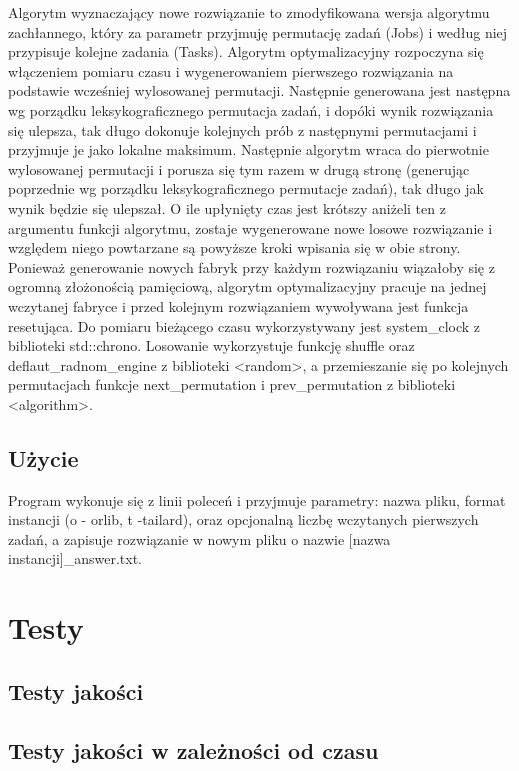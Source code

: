 \documentclass[]{article}
\begin{document}
	Algorytm wyznaczający nowe rozwiązanie to zmodyfikowana wersja algorytmu zachłannego, który za parametr przyjmuję permutację zadań (Jobs) i według niej przypisuje kolejne zadania (Tasks). 
	Algorytm optymalizacyjny rozpoczyna się włączeniem pomiaru czasu i wygenerowaniem pierwszego rozwiązania na podstawie wcześniej wylosowanej permutacji. Następnie generowana jest następna wg porządku leksykograficznego permutacja zadań, i dopóki wynik rozwiązania się ulepsza, tak długo dokonuje kolejnych prób z następnymi permutacjami i przyjmuje je jako lokalne maksimum. Następnie algorytm wraca do pierwotnie wylosowanej permutacji i porusza się tym razem w drugą stronę (generując poprzednie wg porządku leksykograficznego permutacje zadań), tak długo jak wynik będzie się ulepszał. O ile upłynięty czas jest krótszy aniżeli ten z argumentu funkcji algorytmu, zostaje wygenerowane nowe losowe rozwiązanie i względem niego powtarzane są powyższe kroki wpisania się w obie strony. Ponieważ generowanie nowych fabryk przy każdym rozwiązaniu wiązałoby się z ogromną złożonością pamięciową, algorytm optymalizacyjny pracuje na jednej wczytanej fabryce i przed kolejnym rozwiązaniem wywoływana jest funkcja resetująca.
	Do pomiaru bieżącego czasu wykorzystywany jest system\_clock z biblioteki std::chrono. Losowanie wykorzystuje funkcję shuffle oraz deflaut\_radnom\_engine z biblioteki <random>, a przemieszanie się po kolejnych permutacjach funkcje next\_permutation i prev\_permutation z biblioteki <algorithm>.
	
	
	\subsection{Użycie}
	
	 Program wykonuje się z linii poleceń i przyjmuje parametry: nazwa pliku, format instancji (o - orlib, t -tailard), oraz opcjonalną liczbę wczytanych pierwszych zadań, a zapisuje rozwiązanie w nowym pliku o nazwie [nazwa instancji]\_answer.txt. 
	
	\section{Testy}
	\subsection{Testy jakości}
	

	
	
	\subsection{Testy jakości w zależności od czasu}
		
\end{document}
